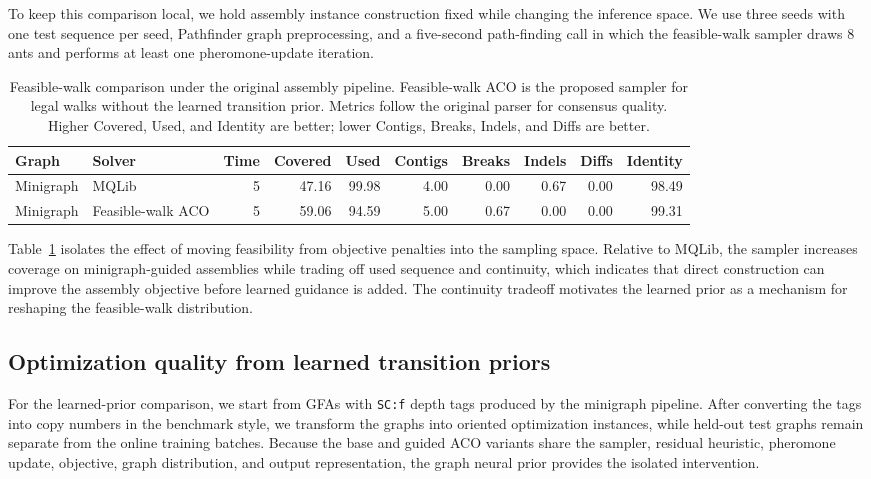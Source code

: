\documentclass[11pt]{article}
\begin{document}
To keep this comparison local, we hold assembly instance construction fixed while changing the inference space. We use three seeds with one test sequence per seed, Pathfinder graph preprocessing, and a five-second path-finding call in which the feasible-walk sampler draws 8 ants and performs at least one pheromone-update iteration.

\begin{table}[t]
\centering
\small
\caption{Feasible-walk comparison under the original assembly pipeline. Feasible-walk ACO is the proposed sampler for legal walks without the learned transition prior. Metrics follow the original parser for consensus quality. Higher Covered, Used, and Identity are better; lower Contigs, Breaks, Indels, and Diffs are better.}
\label{tab:feasible-aco}
\begin{tabular}{llrrrrrrrr}
\hline
Graph & Solver & Time & Covered & Used & Contigs & Breaks & Indels & Diffs & Identity \\
\hline
Minigraph & MQLib      & 5 & 47.16 & 99.98 & 4.00 & 0.00 & 0.67 & 0.00 & 98.49 \\
Minigraph & Feasible-walk ACO & 5 & 59.06 & 94.59 & 5.00 & 0.67 & 0.00 & 0.00 & 99.31 \\
\hline
\end{tabular}
\end{table}

Table~\ref{tab:feasible-aco} isolates the effect of moving feasibility from objective penalties into the sampling space. Relative to MQLib, the sampler increases coverage on minigraph-guided assemblies while trading off used sequence and continuity, which indicates that direct construction can improve the assembly objective before learned guidance is added. The continuity tradeoff motivates the learned prior as a mechanism for reshaping the feasible-walk distribution.

\subsection{Optimization quality from learned transition priors}

For the learned-prior comparison, we start from GFAs with \texttt{SC:f} depth tags produced by the minigraph pipeline. After converting the tags into copy numbers in the benchmark style, we transform the graphs into oriented optimization instances, while held-out test graphs remain separate from the online training batches. Because the base and guided ACO variants share the sampler, residual heuristic, pheromone update, objective, graph distribution, and output representation, the graph neural prior provides the isolated intervention.
\end{document}
